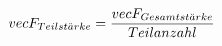 \documentclass[preview]{standalone}
\begin{document}
\begin{align*}
\special{dvisvgm:raw <g id='unique000'>}vec{F_{Teilst \ddot{a} rke}} = \frac{vec{F_{Gesamtst \ddot{a} rke}}} {Teilanzahl}\special{dvisvgm:raw </g>}
\end{align*}
\end{document}
